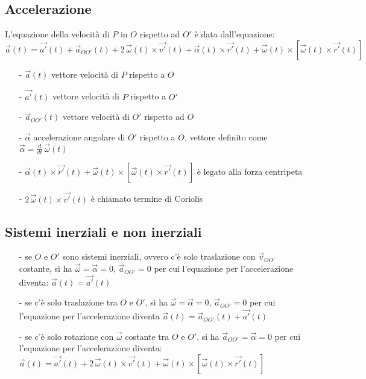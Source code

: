\documentclass[a4paper]{article}
\newcommand\dt{\frac{d}{dt}\,}
\begin{document}
\subsection{Accelerazione}
L'equazione della velocità di \(P\) in \(O\) rispetto ad \(O'\) è data dall'equazione:
\[\vec{a}(t) = \vec{a'}(t) + \vec{a}_{OO'}(t) + 2 \, \vec{\omega}(t) \times \vec{v'}(t) + \vec{\alpha}(t) \times \vec{r'}(t) + \vec{\omega}(t) \times [\vec{\omega}(t) \times \vec{r'}(t)]\]
\begin{itemize}[topsep=3pt, itemsep=0pt]
	\item[-] \(\vec{a}(t)\) vettore velocità di \(P\) rispetto a \(O\)
	\item[-] \(\vec{a'}(t)\) vettore velocità di \(P\) rispetto a \(O'\)
	\item[-] \(\vec{a}_{OO'}(t)\) vettore velocità di \(O'\) rispetto ad \(O\)
	\item[-] \(\vec{\alpha}\) accelerazione angolare di \(O'\) rispetto a \(O\), vettore definito come \(\vec{\alpha} = \dt \vec{\omega}(t)\)
	\item[-] \(\vec{\alpha}(t) \times \vec{r'}(t) + \vec{\omega}(t) \times [\vec{\omega}(t) \times \vec{r'}(t)]\) è legato alla forza centripeta
	\item[-] \(2 \, \vec{\omega}(t) \times \vec{v'}(t)\) è chiamato termine di Coriolis
\end{itemize}

\subsection{Sistemi inerziali e non inerziali}
\begin{itemize}
	\item[-] se \(O\) e \(O'\) sono sistemi inerziali, ovvero c'è solo traslazione con \(\vec{v}_{OO'}\) costante, si ha \(\vec{\omega} = \vec{\alpha} = 0\),
	\(\vec{a}_{OO'} = 0\) per cui l'equazione per l'accelerazione diventa: \(\vec{a}(t) = \vec{a'}(t)\)
	\item[-] se c'è solo traslazione tra \(O\) e \(O'\), si ha \(\vec{\omega} = \vec{\alpha} = 0\), \(\vec{a}_{OO'} = 0\) per cui
	l'equazione per l'accelerazione diventa \(\vec{a}(t) = \vec{a}_{OO'}(t) + \vec{a'}(t)\)
	\item[-] se c'è solo rotazione con \(\vec{\omega}\) costante tra \(O\) e \(O'\), si ha \(\vec{a}_{OO'} = \vec{\alpha} = 0\)
	per cui l'equazione per l'accelerazione diventa: \(\vec{a}(t) = \vec{a'}(t) + 2 \, \vec{\omega}(t) \times \vec{v'}(t) + \vec{\omega}(t) \times [\vec{\omega}(t) \times \vec{r'}(t)]\)
\end{itemize}
\end{document}
